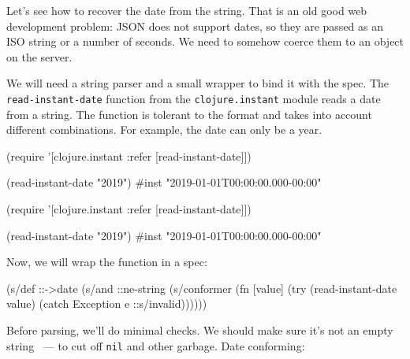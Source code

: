 
Let's see how to recover the date from the string. That is an old good web development problem: JSON does not support dates, so they are passed as an ISO string or a number of seconds. We need to somehow coerce them to an object on the server.


\mnoindent
We will need a string parser and a small wrapper to bind it with the spec. The \verb|read-instant-date| function from the \verb|clojure.instant| module reads a date from a string. The function is tolerant to the format and takes into account different combinations. For example, the date can only be a year.


\ifx\DEVICETYPE\MOBILE

\begin{english}
  \begin{clojure}
(require '[clojure.instant
           :refer [read-instant-date]])

(read-instant-date "2019")
#inst "2019-01-01T00:00:00.000-00:00"
  \end{clojure}
\end{english}

\else

\begin{english}
  \begin{clojure}
(require '[clojure.instant :refer [read-instant-date]])

(read-instant-date "2019")
#inst "2019-01-01T00:00:00.000-00:00"
  \end{clojure}
\end{english}

\fi

Now, we will wrap the function in a spec:

\begin{english}
  \begin{clojure}
(s/def ::->date
  (s/and
   ::ne-string
   (s/conformer
    (fn [value]
      (try
        (read-instant-date value)
        (catch Exception e
          ::s/invalid))))))
  \end{clojure}
\end{english}

Before parsing, we'll do minimal checks. We should make sure it's not an empty string ~--- to cut off \verb|nil| and other garbage. Date conforming: 

